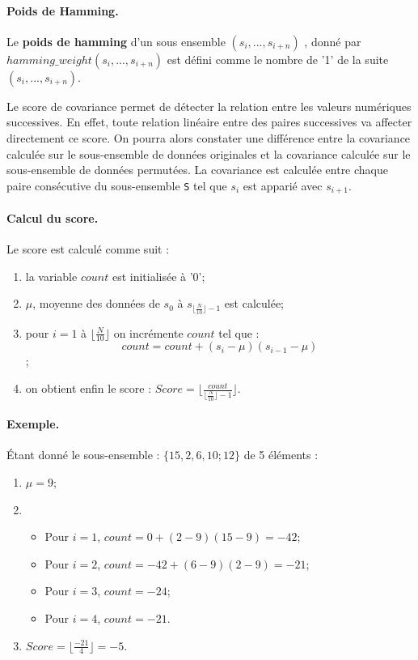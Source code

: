 \paragraph{Poids de Hamming.\\}
Le \textbf{poids de hamming} d'un sous ensemble $(s_i,...,s_{i+n})$ , donné par $hamming\_weight(s_i,...,s_{i+n})$ est défini comme le nombre de '1' de la suite $(s_i,...,s_{i+n})$.



Le score de covariance permet de détecter la relation entre les valeurs numériques successives. En effet, toute relation linéaire entre des paires successives va affecter directement ce score. On pourra alors constater une différence entre la covariance calculée sur le sous-ensemble de données originales et la covariance calculée sur le sous-ensemble de données permutées. La covariance est calculée entre chaque paire consécutive du sous-ensemble \texttt{S} tel que $s_i$ est apparié avec $s_{i+1}$.\\

\paragraph{Calcul du score.\\}
Le score est calculé comme suit : 
\begin{enumerate}
\item la variable $count$ est initialisée à '0';
\item $\mu$, moyenne des données de $s_0$ à $s_{\lfloor\frac{N}{10}\rfloor-1}$ est calculée;
\item pour $i=1$ à $\lfloor\frac{N}{10}\rfloor$ on incrémente $count$ tel que :
$$count = count + (s_i - \mu)(s_{i-1} - \mu)$$;
\item on obtient enfin le score : $Score = \lfloor \frac{count}{\lfloor\frac{N}{10}\rfloor-1} \rfloor$.\\
\end{enumerate}

\paragraph{Exemple.\\}
Étant donné le sous-ensemble : $\lbrace 15, 2 ,6 , 10; 12 \rbrace$ de 5 éléments :
\begin{enumerate}
\item $\mu = 9$;
\item 	\begin{itemize}
		\item Pour $i=1$, $count =0 + (2-9)(15-9) = -42$;
		\item Pour $i=2$, $count = -42 + (6-9)(2-9) = -21$;
		\item Pour $i=3$, $count = -24$;
		\item Pour $i=4$, $count = -21$.\\
		\end{itemize}
\item $Score = \lfloor \frac{-21}{4} \rfloor = -5$.\\
\end{enumerate}

